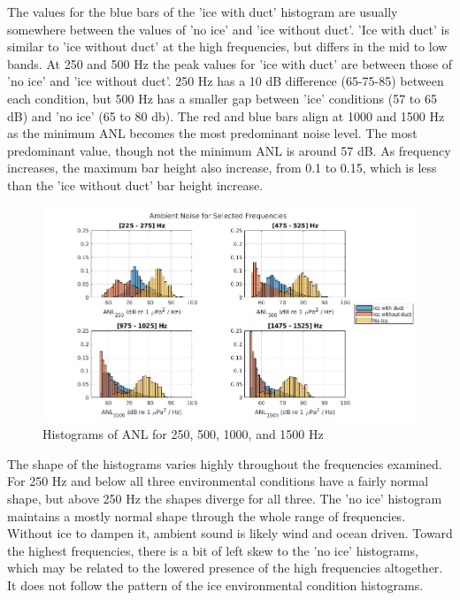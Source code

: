 The values for the blue bars of the 'ice with duct' histogram are usually somewhere between the values of 'no ice' and 'ice without duct'. 'Ice with duct' is similar to 'ice without duct' at the high frequencies, but differs in the mid to low bands. At 250 and 500 Hz the peak values for 'ice with duct' are between those of 'no ice' and 'ice without duct'. 250 Hz has a 10 dB difference (65-75-85) between each condition, but 500 Hz has a smaller gap between 'ice' conditions (57 to 65 dB) and 'no ice' (65 to 80 db). The red and blue bars align at 1000 and 1500 Hz as the minimum ANL becomes the most predominant noise level. The most predominant value, though not the minimum ANL is around 57 dB. As frequency increases, the maximum bar height also increase, from 0.1 to 0.15, which is less than the 'ice without duct' bar height increase.

\begin{figure}[h]
\centering
\includegraphics[scale=0.45]{Figures/selected_hists.jpg}
\caption{Histograms of ANL for 250, 500, 1000, and 1500 Hz}
\label{fig_selhist}
\end{figure}

The shape of the histograms varies highly throughout the frequencies examined. For 250 Hz and below all three environmental conditions have a fairly normal shape, but above 250 Hz the shapes diverge for all three. The 'no ice' histogram maintains a mostly normal shape through the whole range of frequencies. Without ice to dampen it, ambient sound is likely wind and ocean driven. Toward the highest frequencies, there is a bit of left skew to the 'no ice' histograms, which may be related to the lowered presence of the high frequencies altogether. It does not follow the pattern of the ice environmental condition histograms.

